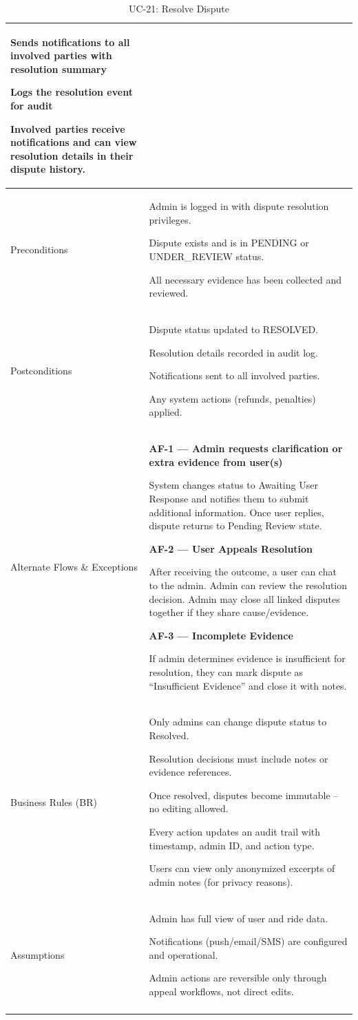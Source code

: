 \begin{longtable}{|p{3.5cm}|p{12cm}|}
Sends notifications to all involved parties with resolution summary

Logs the resolution event for audit

Involved parties receive notifications and can view resolution details in their dispute history. \\
\hline
Preconditions &
Admin is logged in with dispute resolution privileges.

Dispute exists and is in PENDING or UNDER\_REVIEW status.

All necessary evidence has been collected and reviewed. \\
\hline
Postconditions &
Dispute status updated to RESOLVED.

Resolution details recorded in audit log.

Notifications sent to all involved parties.

Any system actions (refunds, penalties) applied. \\
\hline
Alternate Flows \& Exceptions &
\textbf{AF-1 --- Admin requests clarification or extra evidence from user(s)}

System changes status to Awaiting User Response and notifies them to submit additional information. Once user replies, dispute returns to Pending Review state.

\textbf{AF-2 --- User Appeals Resolution}

After receiving the outcome, a user can chat to the admin. Admin can review the resolution decision. Admin may close all linked disputes together if they share cause/evidence.

\textbf{AF-3 --- Incomplete Evidence}

If admin determines evidence is insufficient for resolution, they can mark dispute as “Insufficient Evidence” and close it with notes. \\
\hline
Business Rules (BR) &
Only admins can change dispute status to Resolved.

Resolution decisions must include notes or evidence references.

Once resolved, disputes become immutable – no editing allowed.

Every action updates an audit trail with timestamp, admin ID, and action type.

Users can view only anonymized excerpts of admin notes (for privacy reasons). \\
\hline
Assumptions &
Admin has full view of user and ride data.

Notifications (push/email/SMS) are configured and operational.

Admin actions are reversible only through appeal workflows, not direct edits. \\
\hline
\caption{UC-21: Resolve Dispute}
\end{longtable}

